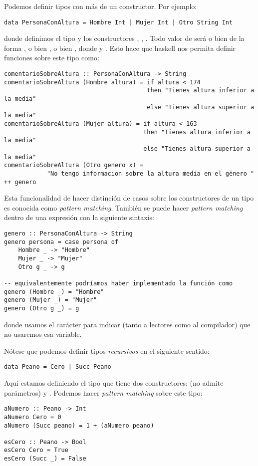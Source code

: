 Podemos definir tipos con más de un constructor. Por ejemplo:
\begin{verbatim}
data PersonaConAltura = Hombre Int | Mujer Int | Otro String Int
\end{verbatim}
donde definimos el tipo  y los constructores
,
,
. Todo valor de
 será o bien de la forma
, o bien , o bien , donde
 y . Esto hace que haskell
nos permita definir funciones sobre este tipo como:
\begin{verbatim}
comentarioSobreAltura :: PersonaConAltura -> String
comentarioSobreAltura (Hombre altura) = if altura < 174
                                        then "Tienes altura inferior a la media"
                                        else "Tienes altura superior a la media"
comentarioSobreAltura (Mujer altura) = if altura < 163
                                       then "Tienes altura inferior a la media"
                                       else "Tienes altura superior a la media"
comentarioSobreAltura (Otro genero x) =
            "No tengo informacion sobre la altura media en el género " ++ genero
\end{verbatim}
Esta funcionalidad de hacer distinción de casos sobre los constructores
de un tipo es conocida como \textit{pattern matching}. También se puede
hacer \textit{pattern matching} dentro de una expresión con la siguiente
sintaxis:
\begin{verbatim}
genero :: PersonaConAltura -> String
genero persona = case persona of
    Hombre _ -> "Hombre"
    Mujer _ -> "Mujer"
    Otro g _ -> g

-- equivalentemente podríamos haber implementado la función como
genero (Hombre _) = "Hombre"
genero (Mujer _) = "Mujer"
genero (Otro g _) = g
\end{verbatim}
donde usamos el carácter \cod{\_} para indicar (tanto a lectores como
al compilador) que no usaremos esa variable.

Nótese que podemos definir tipos \textit{recursivos} en el siguiente
sentido:
\begin{verbatim}
data Peano = Cero | Succ Peano
\end{verbatim}
Aquí estamos definiendo el tipo  que tiene dos constructores:
 (no admite parámetros) y .
Podemos hacer \textit{pattern matching} sobre este tipo:
\begin{verbatim}
aNumero :: Peano -> Int
aNumero Cero = 0
aNumero (Succ peano) = 1 + (aNumero peano)

esCero :: Peano -> Bool
esCero Cero = True
esCero (Succ _) = False
\end{verbatim}

